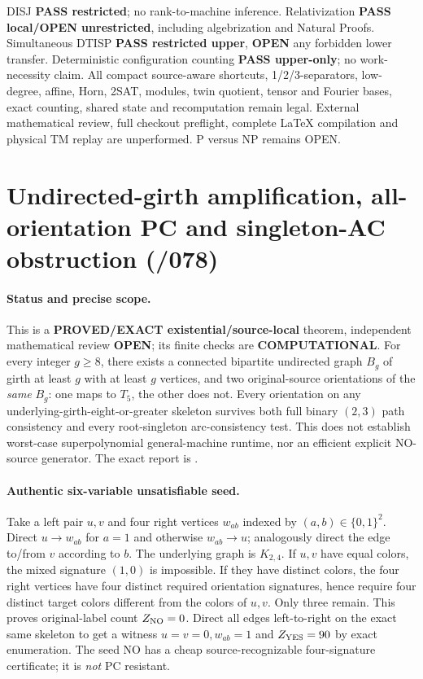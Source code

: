 \documentclass[11pt]{article}
\begin{document}
DISJ \textbf{PASS restricted}; no rank-to-machine inference.
Relativization \textbf{PASS local/OPEN unrestricted},
including algebrization and Natural Proofs.
Simultaneous DTISP \textbf{PASS restricted upper},
\textbf{OPEN} any forbidden lower transfer.
Deterministic configuration counting \textbf{PASS upper-only};
no work-necessity claim. All compact source-aware shortcuts,
1/2/3-separators, low-degree, affine, Horn, 2SAT, modules,
twin quotient, tensor and Fourier bases, exact counting,
shared state and recomputation remain legal.
External mathematical review, full checkout preflight,
complete LaTeX compilation and physical TM replay
are unperformed. P versus NP remains OPEN.

\section{Undirected-girth amplification, all-orientation PC and singleton-AC obstruction (/078)}
\paragraph{Status and precise scope.}
This is a \textbf{PROVED/EXACT existential/source-local} theorem,
independent mathematical review \textbf{OPEN}; its finite
checks are \textbf{COMPUTATIONAL}. For every integer $g\geq 8$,
there exists a connected bipartite undirected graph $B_g$
of girth at least $g$ with at least $g$ vertices, and
two original-source orientations of the \emph{same} $B_g$:
one maps to $T_5$, the other does not. Every orientation
on any underlying-girth-eight-or-greater skeleton
survives both full binary $(2,3)$ path consistency
and every root-singleton arc-consistency test.
This does not establish worst-case superpolynomial
general-machine runtime, nor an efficient explicit
NO-source generator. The exact report is
.

\paragraph{Authentic six-variable unsatisfiable seed.}
Take a left pair $u,v$ and four right vertices $w_{ab}$
indexed by $(a,b)\in\{0,1\}^2$.
Direct $u\to w_{ab}$ for $a=1$ and otherwise
$w_{ab}\to u$; analogously direct the edge to/from
$v$ according to $b$. The underlying graph is $K_{2,4}$.
If $u,v$ have equal colors, the mixed signature $(1,0)$
is impossible. If they have distinct colors, the four
right vertices have four distinct required orientation
signatures, hence require four distinct target colors
different from the colors of $u,v$. Only three remain.
This proves original-label count $Z_{\rm NO}=0$.
Direct all edges left-to-right on the exact same
skeleton to get a witness $u=v=0,w_{ab}=1$ and
$Z_{\rm YES}=90$ by exact enumeration.
The seed NO has a cheap source-recognizable
four-signature certificate; it is \emph{not} PC resistant.
\end{document}
